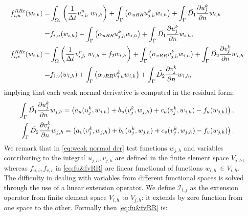 \begin{equation} \label{eq:fu&fvRR}
\begin{aligned}
f_{i,u}^{RRc}(w_{i,h}) = & \int_{\Omega_i} \left( \frac{1}{\Delta t} u_{i,h}^n \ w_{i,h} \right)  + \int_{\Gamma} \left(\alpha_{uRR} u_{j,h}^{k} w_{i,h} \right) + \int_{\Gamma} \Tilde{D_1} \frac{\partial u_j^k}{\partial n} w_{i,h} \\
= & f_{i,u}(w_{i,h}) + \int_{\Gamma} \left(\alpha_{uRR} u_{j,h}^{k} w_{i,h} \right) + \int_{\Gamma} \Tilde{D_1} \frac{\partial u_j^k}{\partial n} w_{i,h}, \\
f_{i,v}^{RRc}(w_{i,h}) = & \int_{\Omega} \left( \frac{1}{\Delta t} v_{i,h}^n \ w_{i,h} + f_2 w_{i,h} \right) + \int_{\Gamma} \left(\alpha_{vRR} v_{j,h}^{k} w_{i,h} \right) + \int_{\Gamma} \Tilde{D_2} \frac{\partial v_j^k}{\partial n} w_{i,h} \\
= & f_{i,v}(w_{i,h}) + \int_{\Gamma} \left(\alpha_{vRR} v_{j,h}^{k} w_{i,h} \right) + \int_{\Gamma} \Tilde{D_2} \frac{\partial v_j^k}{\partial n} w_{i,h},
\end{aligned}
\end{equation}
implying that each weak normal derivative is computed in the residual form:
\begin{equation}\label{eq:weak normal der}\begin{aligned}
    \int_{\Gamma} \Tilde{D_1} \frac{\partial u_j^k}{\partial n} w_{j,h} = \left( a_u(u_j^k, w_{j,h}) + b_u(v_j^k,w_{j,h}) + c_u(v_j^k, w_{j,h})- f_u(w_{j,h}) \right), \\
    \int_{\Gamma} \Tilde{D_2} \frac{\partial v_j^k}{\partial n} w_{j,h} = \left( a_v(v_j^k, w_{j,h}) + b_v(u_j^k,w_{j,h}) + c_v(v_j^k, w_{j,h})- f_v(w_{j,h}) \right).
\end{aligned}\end{equation}
We remark that in \eqref{eq:weak normal der} test functions $w_{j,h}$ and variables contributing to the integral $u_{j,h}, v_{j,h}$ are defined in the finite element space $V_{j,h}$, whereas $f_{u,i}, f_{v,i}$ in \eqref{eq:fu&fvRR} are linear functional of functions $w_{i,h} \ \in V_{i,h}$. The difficulty in dealing with variables from different functional spaces is solved through the use of a linear extension operator. We define $\mathcal{I}_{i,j}$ as the extension operator from finite element space $V_{i,h}$ to $V_{j,h}$: it extends by zero function from one space to the other. Formally then \eqref{eq:fu&fvRR} is:
